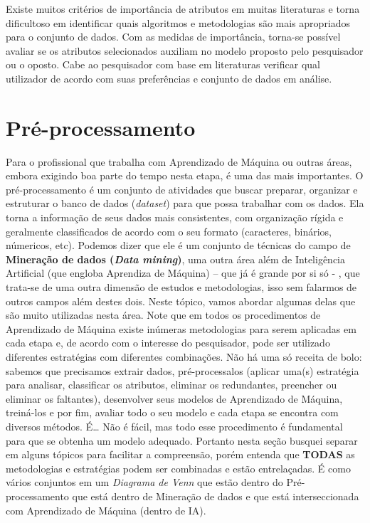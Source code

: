 \documentclass[
  openany]{book}
\begin{document}
Existe muitos critérios de importância de atributos em muitas literaturas e torna dificultoso em identificar quais algoritmos e metodologias são mais apropriados para o conjunto de dados. Com as medidas de importância, torna-se possível avaliar se os atributos selecionados auxiliam no modelo proposto pelo pesquisador ou o oposto. Cabe ao pesquisador com base em literaturas verificar qual utilizador de acordo com suas preferências e conjunto de dados em análise.

\hypertarget{preprocesso}{%
\chapter{Pré-processamento}\label{preprocesso}}

Para o profissional que trabalha com Aprendizado de Máquina ou outras áreas, embora exigindo boa parte do tempo nesta etapa, é uma das mais importantes. O pré-processamento é um conjunto de atividades que buscar preparar, organizar e estruturar o banco de dados (\emph{dataset}) para que possa trabalhar com os dados. Ela torna a informação de seus dados mais consistentes, com organização rígida e geralmente classificados de acordo com o seu formato (caracteres, binários, númericos, etc). Podemos dizer que ele é um conjunto de técnicas do campo de \textbf{Mineração de dados (\emph{Data mining})}, uma outra área além de Inteligência Artificial (que engloba Aprendiza de Máquina) -- que já é grande por si só - , que trata-se de uma outra dimensão de estudos e metodologias, isso sem falarmos de outros campos além destes dois. Neste tópico, vamos abordar algumas delas que são muito utilizadas nesta área. Note que em todos os procedimentos de Aprendizado de Máquina existe inúmeras metodologias para serem aplicadas em cada etapa e, de acordo com o interesse do pesquisador, pode ser utilizado diferentes estratégias com diferentes combinações. Não há uma só receita de bolo: sabemos que precisamos extrair dados, pré-processalos (aplicar uma(s) estratégia para analisar, classificar os atributos, eliminar os redundantes, preencher ou eliminar os faltantes), desenvolver seus modelos de Aprendizado de Máquina, treiná-los e por fim, avaliar todo o seu modelo e cada etapa se encontra com diversos métodos. É\ldots{} Não é fácil, mas todo esse procedimento é fundamental para que se obtenha um modelo adequado. Portanto nesta seção busquei separar em alguns tópicos para facilitar a compreensão, porém entenda que \textbf{TODAS} as metodologias e estratégias podem ser combinadas e estão entrelaçadas. É como vários conjuntos em um \emph{Diagrama de Venn} que estão dentro do Pré-processamento que está dentro de Mineração de dados e que está interseccionada com Aprendizado de Máquina (dentro de IA).
\end{document}
